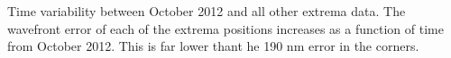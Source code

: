 Time variability between October 2012 and all other extrema data. The wavefront error of each of the extrema positions increases as a function of time from October 2012. This is far lower thant he 190 nm error in the corners. 
\label{fig:inst_time_var}        
  